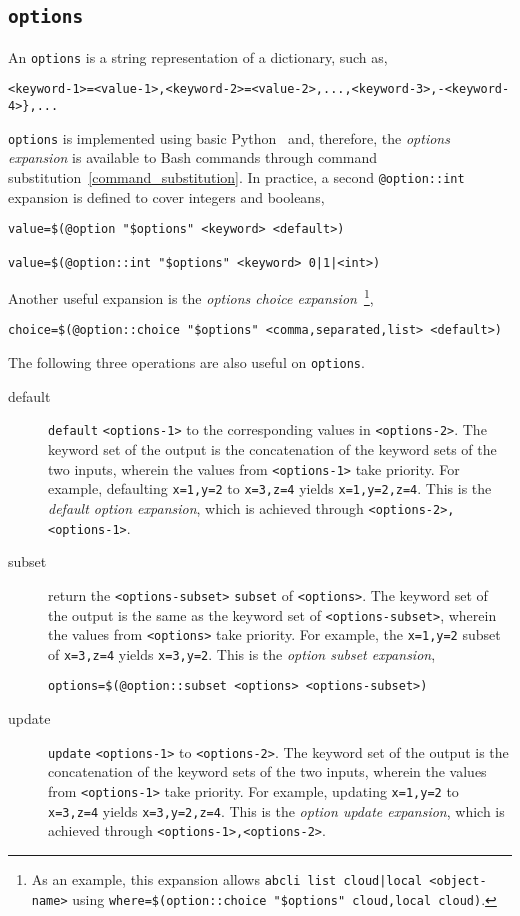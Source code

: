 \subsection{\texttt{options}}\label{options}

An \texttt{options} is a string representation of a dictionary, such as,
%
\begin{verbatim}
<keyword-1>=<value-1>,<keyword-2>=<value-2>,...,<keyword-3>,-<keyword-4>},...
\end{verbatim}
%
\texttt{options} is implemented using basic Python~ and, therefore, the \emph{options expansion} is available to Bash commands through command substitution~\ref{command_substitution}. In practice, a second \texttt{@option::int} expansion is defined to cover integers and booleans,
%
\begin{verbatim}
value=$(@option "$options" <keyword> <default>)

value=$(@option::int "$options" <keyword> 0|1|<int>)
\end{verbatim}
%
Another useful expansion is the \emph{options choice expansion}~\footnote{
As an example, this expansion allows \texttt{abcli list cloud|local <object-name>} using \texttt{where=\$(option::choice "\$options" cloud,local cloud)}.
},
%
\begin{verbatim}
choice=$(@option::choice "$options" <comma,separated,list> <default>)
\end{verbatim}
%
The following three operations are also useful on \texttt{options}.
%
\begin{description}
%
\item[default]{\texttt{default} \texttt{<options-1>} to the corresponding values in \texttt{<options-2>}. The keyword set of the output is the concatenation of the keyword sets of the two inputs, wherein the values from \texttt{<options-1>} take priority. For example, defaulting \texttt{x=1,y=2} to \texttt{x=3,z=4} yields \texttt{x=1,y=2,z=4}. This is the \emph{default option expansion}, which is achieved through \texttt{<options-2>,<options-1>}.}
%
\item[subset]{return the \texttt{<options-subset>} \texttt{subset} of \texttt{<options>}. The keyword set of the output is the same as the keyword set of \texttt{<options-subset>}, wherein the values from \texttt{<options>} take priority. For example, the \texttt{x=1,y=2} subset of \texttt{x=3,z=4} yields \texttt{x=3,y=2}. This is the \emph{option subset expansion},
\begin{verbatim}
options=$(@option::subset <options> <options-subset>)
\end{verbatim}
}
%
\item[update]{\texttt{update} \texttt{<options-1>} to \texttt{<options-2>}. The keyword set of the output is the concatenation of the keyword sets of the two inputs, wherein the values from \texttt{<options-1>} take priority. For example, updating \texttt{x=1,y=2} to \texttt{x=3,z=4} yields \texttt{x=3,y=2,z=4}. This is the \emph{option update expansion}, which is achieved through \texttt{<options-1>,<options-2>}.}
%
\end{description}
